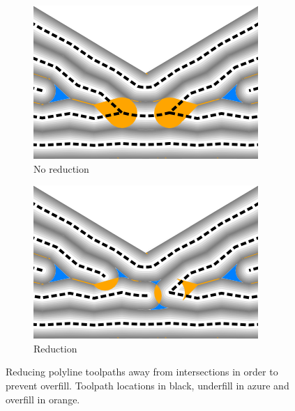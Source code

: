 \begin{figure}
\centering
\setlength{\figwidth}{.35\columnwidth}
\begin{subfigure}{0.45\columnwidth}\centering
\includegraphics[width=\figwidth]{sources/method/polyline_reduction_before}
\caption{No reduction}
\end{subfigure}
\begin{subfigure}{0.45\columnwidth}\centering
\includegraphics[width=\figwidth]{sources/method/polyline_reduction_after}
\caption{Reduction}
\end{subfigure}
\caption{
Reducing polyline toolpaths away from intersections in order to prevent overfill.
Toolpath locations in black, underfill in azure and overfill in orange.
}
\label{polyline_reduction}
\end{figure}



























































